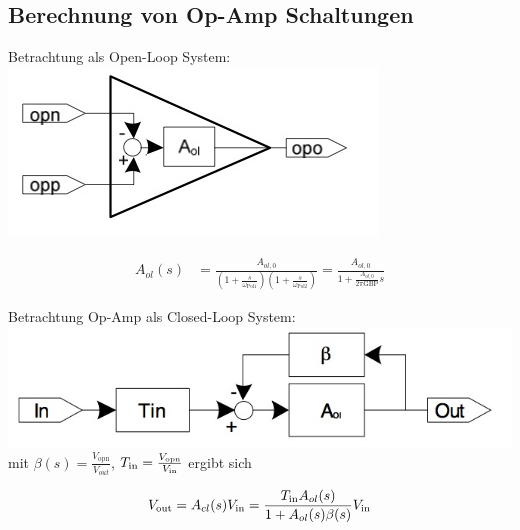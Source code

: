 \subsection{Berechnung von Op-Amp Schaltungen}
\begin{multicols}{2}
Betrachtung als Open-Loop System: \\
\includegraphics[width=0.4\linewidth]{images/op_ol.jpg}

\begin{align*}
A_{ol}(s) &= \frac{A_{ol,0}}{\left(1+\frac{s}{\omega_{\text{Pol}1}}\right)\left(1+\frac{s}{\omega_{\text{Pol}2}}\right)} = \frac{A_{ol,0}}{1 + \frac{A_{ol,0}}{2 \pi \text{GBP}}s}
\end{align*}

Betrachtung Op-Amp als Closed-Loop System: \\
\includegraphics[width=0.8\linewidth]{images/op_feedback.jpg} \\
mit $\beta(s) = \frac{V_{\text{opn}}}{V_{out}}$, $T_{\operatorname{\text{in}}} = \frac{V_{\text{opn}}}{V_{\operatorname{\text{in}}}}$
ergibt sich

\begin{equation*}
	V_{\operatorname{\text{out}}} = A_{cl}(s) V_{\operatorname{\text{in}}} = \frac{T_{\operatorname{\text{in}}} A_{ol}(s)}{1+A_{ol}(s) \beta(s)} V_{\operatorname{\text{in}}}
\end{equation*}
 
\end{multicols}



